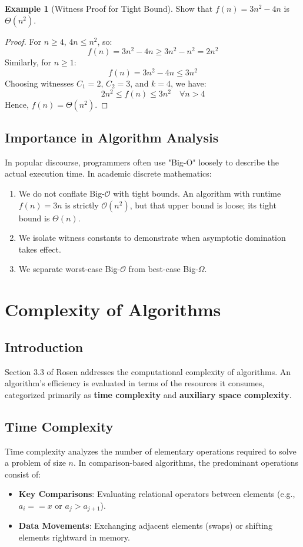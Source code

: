 \documentclass[11pt,a4paper,oneside]{report}
\theoremstyle{definition}
\newtheorem{example}{Example}[chapter]
\begin{document}
\begin{example}[Witness Proof for Tight Bound]
Show that $f(n) = 3n^2 - 4n$ is $\Theta(n^2)$.
\begin{proof}
For $n \ge 4$, $4n \le n^2$, so:
$$f(n) = 3n^2 - 4n \ge 3n^2 - n^2 = 2n^2$$
Similarly, for $n \ge 1$:
$$f(n) = 3n^2 - 4n \le 3n^2$$
Choosing witnesses $C_1 = 2$, $C_2 = 3$, and $k = 4$, we have:
$$2n^2 \le f(n) \le 3n^2 \quad \forall n > 4$$
Hence, $f(n) = \Theta(n^2)$.
\end{proof}
\end{example}

\section{Importance in Algorithm Analysis}
In popular discourse, programmers often use "Big-O" loosely to describe the actual execution time. In academic discrete mathematics:
\begin{enumerate}
    \item We do not conflate Big-$\mathcal{O}$ with tight bounds. An algorithm with runtime $f(n) = 3n$ is strictly $\mathcal{O}(n^2)$, but that upper bound is loose; its tight bound is $\Theta(n)$.
    \item We isolate witness constants to demonstrate when asymptotic domination takes effect.
    \item We separate worst-case Big-$\mathcal{O}$ from best-case Big-$\Omega$.
\end{enumerate}

\chapter{Complexity of Algorithms}
\label{chap:complexity}

\section{Introduction}
Section 3.3 of Rosen \cite{rosen2019discrete} addresses the computational complexity of algorithms. An algorithm's efficiency is evaluated in terms of the resources it consumes, categorized primarily as \textbf{time complexity} and \textbf{auxiliary space complexity}.

\section{Time Complexity}
Time complexity analyzes the number of elementary operations required to solve a problem of size $n$. In comparison-based algorithms, the predominant operations consist of:
\begin{itemize}
    \item \textbf{Key Comparisons}: Evaluating relational operators between elements (e.g., $a_i == x$ or $a_j > a_{j+1}$).
    \item \textbf{Data Movements}: Exchanging adjacent elements (swaps) or shifting elements rightward in memory.
\end{itemize}
\end{document}
